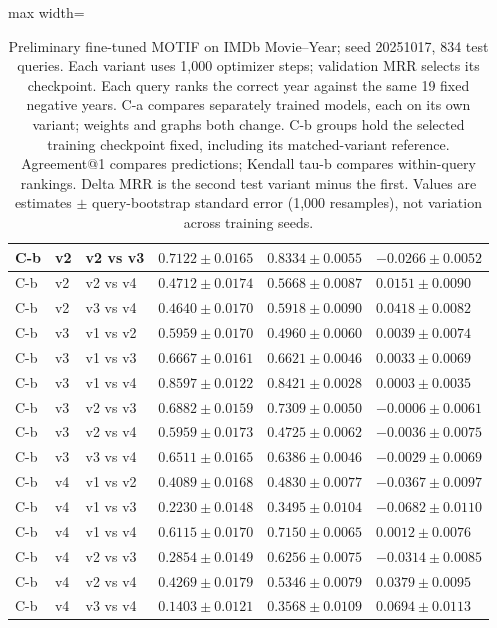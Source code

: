 \begin{table}[htbp]
\begin{adjustbox}{max width=\linewidth}
\begin{tabular}{|l|l|l|l|l|l|}
\hline
C-b & v2 & v2 vs v3 & $0.7122 \pm 0.0165$ & $0.8334 \pm 0.0055$ & $-0.0266 \pm 0.0052$ \\
\hline
C-b & v2 & v2 vs v4 & $0.4712 \pm 0.0174$ & $0.5668 \pm 0.0087$ & $0.0151 \pm 0.0090$ \\
\hline
C-b & v2 & v3 vs v4 & $0.4640 \pm 0.0170$ & $0.5918 \pm 0.0090$ & $0.0418 \pm 0.0082$ \\
\hline
C-b & v3 & v1 vs v2 & $0.5959 \pm 0.0170$ & $0.4960 \pm 0.0060$ & $0.0039 \pm 0.0074$ \\
\hline
C-b & v3 & v1 vs v3 & $0.6667 \pm 0.0161$ & $0.6621 \pm 0.0046$ & $0.0033 \pm 0.0069$ \\
\hline
C-b & v3 & v1 vs v4 & $0.8597 \pm 0.0122$ & $0.8421 \pm 0.0028$ & $0.0003 \pm 0.0035$ \\
\hline
C-b & v3 & v2 vs v3 & $0.6882 \pm 0.0159$ & $0.7309 \pm 0.0050$ & $-0.0006 \pm 0.0061$ \\
\hline
C-b & v3 & v2 vs v4 & $0.5959 \pm 0.0173$ & $0.4725 \pm 0.0062$ & $-0.0036 \pm 0.0075$ \\
\hline
C-b & v3 & v3 vs v4 & $0.6511 \pm 0.0165$ & $0.6386 \pm 0.0046$ & $-0.0029 \pm 0.0069$ \\
\hline
C-b & v4 & v1 vs v2 & $0.4089 \pm 0.0168$ & $0.4830 \pm 0.0077$ & $-0.0367 \pm 0.0097$ \\
\hline
C-b & v4 & v1 vs v3 & $0.2230 \pm 0.0148$ & $0.3495 \pm 0.0104$ & $-0.0682 \pm 0.0110$ \\
\hline
C-b & v4 & v1 vs v4 & $0.6115 \pm 0.0170$ & $0.7150 \pm 0.0065$ & $0.0012 \pm 0.0076$ \\
\hline
C-b & v4 & v2 vs v3 & $0.2854 \pm 0.0149$ & $0.6256 \pm 0.0075$ & $-0.0314 \pm 0.0085$ \\
\hline
C-b & v4 & v2 vs v4 & $0.4269 \pm 0.0179$ & $0.5346 \pm 0.0079$ & $0.0379 \pm 0.0095$ \\
\hline
C-b & v4 & v3 vs v4 & $0.1403 \pm 0.0121$ & $0.3568 \pm 0.0109$ & $0.0694 \pm 0.0113$ \\
\hline
\end{tabular}
\end{adjustbox}
\caption{Preliminary fine-tuned MOTIF on IMDb Movie--Year; seed 20251017, 834 test queries. Each variant uses 1,000 optimizer steps; validation MRR selects its checkpoint. Each query ranks the correct year against the same 19 fixed negative years. C-a compares separately trained models, each on its own variant; weights and graphs both change. C-b groups hold the selected training checkpoint fixed, including its matched-variant reference. Agreement@1 compares predictions; Kendall tau-b compares within-query rankings. Delta MRR is the second test variant minus the first. Values are estimates $\pm$ query-bootstrap standard error (1,000 resamples), not variation across training seeds.}
\label{tab:motif-imdb-movie-year-matrix-invariance}
\end{table}
